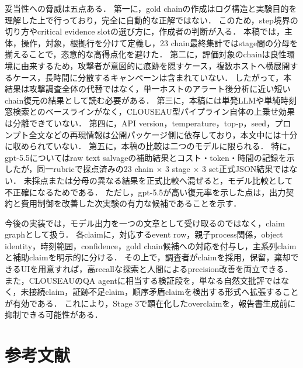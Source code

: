 \documentclass[dvipdfmx]{FITpaper}
\newcommand{\model}[1]{\mbox{\textrm{#1}}}
\begin{document}
妥当性への脅威は五点ある．
第一に，gold chainの作成はログ構造と実験目的を理解した上で行っており，完全に自動的な正解ではない．
このため，step境界の切り方やcritical evidence slotの選び方に，作成者の判断が入る．
本稿では，主体，操作，対象，根拠行を分けて定義し，23 chain最終集計ではstage間の分母を揃えることで，恣意的な高得点化を避けた．
第二に，評価対象のchainは良性環境に由来するため，攻撃者が意図的に痕跡を隠すケース，複数ホストへ横展開するケース，長時間に分散するキャンペーンは含まれていない．
したがって，本結果は攻撃調査全体の代替ではなく，単一ホストのアラート後分析に近い短いchain復元の結果として読む必要がある．
第三に，本稿には単発LLMや単純時刻窓検索とのベースラインがなく，CLOUSEAU型パイプライン自体の上乗せ効果は分離できていない．
第四に，API version，temperature，top-p，seed，プロンプト全文などの再現情報は公開パッケージ側に依存しており，本文中には十分に収められていない．
第五に，本稿の比較は二つのモデルに限られる．
特に，\model{gpt-5.5}についてはraw text salvageの補助結果とコスト・token・時間の記録を示したが，同一rubricで採点済みの23 chain $\times$ 3 stage $\times$ 3 set正式JSON結果ではない．
未採点または分母の異なる結果を正式比較へ混ぜると，モデル比較として不正確になるためである．
ただし，\model{gpt-5.5}が高い復元率を示した点は，出力契約と費用制御を改善した次実験の有力な候補であることを示す．

今後の実装では，モデル出力を一つの文章として受け取るのではなく，claim graphとして扱う．
各claimに，対応するevent row，親子process関係，object identity，時刻範囲，confidence，gold chain候補への対応を付与し，主系列claimと補助claimを明示的に分ける．
その上で，調査者がclaimを採用，保留，棄却できるUIを用意すれば，高recallな探索と人間によるprecision改善を両立できる．
また，CLOUSEAUのQA agentに相当する検証段を，単なる自然文批評ではなく，未接続claim，証跡不足claim，順序矛盾claimを検出する形式へ拡張することが有効である．
これにより，Stage 3で顕在化したoverclaimを，報告書生成前に抑制できる可能性がある．



\section*{参考文献}
\end{document}
